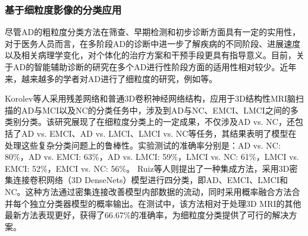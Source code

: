 \subsubsection{基于细粒度影像的分类应用} 
尽管AD的粗粒度分类方法在筛查、早期检测和初步诊断方面具有一定的实用性，对于医务人员而言，在多阶段AD的诊断中进一步了解疾病的不同阶段、进展速度以及相关病理学变化，对个体化的治疗方案和干预手段更具有指导意义。目前，关于AD的智能辅助诊断的研究在多个AD进行性阶段方面的适用性相对较少。近年来，越来越多的学者对AD进行了细粒度的研究，例如\cite{korolev2017residual,ruiz20203d,song2019graph,parmar2020spatiotemporal,pan2020early,basaia2019automated,helaly2021deep,fu2021automated,shamrat2023alzheimernet}等。

Korolev等人\cite{korolev2017residual}采用残差网络和普通3D卷积神经网络结构，应用于3D结构性MRI脑扫描的AD与MCI以及NC的分类任务中，涉及到AD与NC、EMCI、LMCI之间的多类别分类。该研究展现了在细粒度分类上的一定成果，不仅涉及AD vs. NC，还包括了AD vs. EMCI、AD vs. LMCI、LMCI vs. NC等任务，其结果表明了模型在处理这些复杂分类问题上的鲁棒性。实验测试的准确率分别是：AD vs. NC: 80\%，AD vs. EMCI: 63\%，AD vs. LMCI: 59\%，LMCI vs. NC: 61\%，LMCI vs. EMCI: 52\%，EMCI vs. NC: 56\%。
Ruiz等人\cite{ruiz20203d}则提出了一种集成方法，采用3D密集连接卷积网络（3D DenseNets）模型进行四分类，即AD、EMCI、LMCI和NC。这种方法通过密集连接改善模型内部数据的流动，同时采用概率融合方法合并每个独立分类器模型的概率输出。在测试中，该方法相对于处理3D MRI的其他最新方法表现更好，获得了66.67\%的准确率，为细粒度分类提供了可行的解决方案。
    
